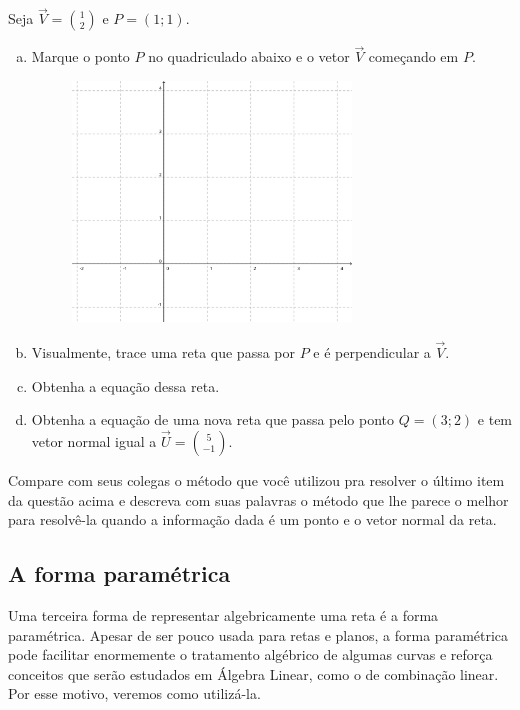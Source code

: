 \documentclass[main_estudante.tex]{subfiles}
\begin{document}
\begin{questao}
Seja $\overrightarrow{V}=\binom{1}{2}$ e $P=(1;1)$.
\begin{enumerate}[a)]
\item Marque o ponto $P$ no quadriculado abaixo e o vetor $\overrightarrow{V}$ começando em $P$.

\begin{figure}[h]
\centering
\includegraphics[width=0.7\textwidth]{./img/c6q9.png}
\end{figure}

\item Visualmente, trace uma reta que passa por $P$ e é perpendicular a $\overrightarrow{V}$.
\item Obtenha a equação dessa reta.
\item Obtenha a equação de uma nova reta que passa pelo ponto $Q=(3;2)$ e tem vetor normal igual a $\overrightarrow{U}=\binom{5}{-1}$.
\end{enumerate}
\end{questao}

\begin{reflita}
 Compare com seus colegas o método que você utilizou pra resolver o último item da questão acima e descreva com suas palavras o método que lhe parece o melhor para resolvê-la quando a informação dada é um ponto e o vetor normal da reta.
\end{reflita}


\subsection*{A forma paramétrica}

Uma terceira forma de representar algebricamente uma reta é a forma paramétrica. Apesar de ser pouco usada para retas e planos, a forma paramétrica pode facilitar enormemente o tratamento algébrico de algumas curvas e reforça conceitos que serão estudados em Álgebra Linear, como o de combinação linear. Por esse motivo, veremos como utilizá-la.
\end{document}
